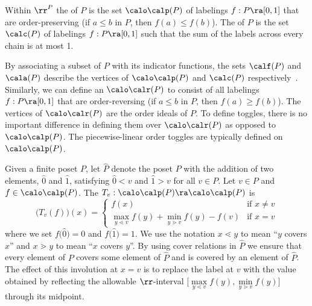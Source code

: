 \begin{defi}
Within $\rr^{P}$ the  of $P$ is the set $\calo\calp(P)$ of labelings $f:P\ra [0,1]$ that are order-preserving (\ie if $a\leq b$ in $P$, then $f(a)\leq f(b)$).
The  of $P$ is the set $\calc(P)$ of labelings $f:P\ra [0,1]$ such that the sum of the labels across every chain is at most 1.
\end{defi}

By associating a subset of $P$ with its indicator functions, the sets $\calf(P)$ and $\cala(P)$ describe the vertices of $\calo\calp(P)$ and $\calc(P)$ respectively~\cite{Sta86}.
Similarly, we can define an  $\calo\calr(P)$ to consist of all labelings $f:P\ra [0,1]$ that are order-reversing (\ie if $a\leq b$ in $P$, then $f(a)\geq f(b)$). The vertices of $\calo\calr(P)$ are the order ideals of $P$.
To define toggles, there is no important difference in defining them over $\calo\calr(P)$ as opposed to $\calo\calp(P)$. The piecewise-linear order toggles are typically defined on $\calo\calp(P)$.

\begin{defi}
Given a finite poset $P$, let $\widehat{P}$ denote the poset $P$ with the addition of two
elements, $\widehat{0}$ and $\widehat{1}$, satisfying $\widehat{0}< v$ and $\widehat{1}>v$
for all $v\in P$. 
Let $v\in P$ and $f\in\calo\calp(P)$.
The  $T_v:\calo\calp(P)\ra \calo\calp(P)$ is
\[
\big(T_v(f)\big)(x) =
\begin{cases}
f(x) &\text{if }x\not=v\\
\max\limits_{y\lessdot v} f(y) + 
\min\limits_{y\gtrdot v} f(y) - f(v)
&\text{if }x=v\end{cases}
\]
where we set $f\big(\widehat{0}\big)=0$ and $f\big(\widehat{1}\big)=1$.
We use the notation $x\lessdot y$ to mean ``$y$ covers $x$'' and $x\gtrdot y$ to mean ``$x$
covers $y$''. By using cover relations in $\widehat{P}$ we ensure that every element
of $P$ covers some element of $\widehat{P}$ and is covered by an element of $\widehat{P}$. 
The effect of this involution at $x=v$ is to replace the label at $v$ with the value obtained
by reflecting the allowable $\rr$-interval $\Big[\max\limits_{y\lessdot v} f(y), \min\limits_{y\gtrdot
v} f(y)\Big]$ through its midpoint.
\end{defi}

